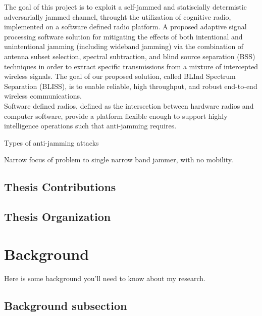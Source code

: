 \documentclass[11pt]{mvlthesis}
\begin{document}
The goal of this project is to exploit a self-jammed and statiscially determistic adversarially jammed channel, throught the utilization of cognitive radio, implemented on a software defined radio platform.  A proposed adaptive signal processing software solution for mitigating the effects of both intentional and unintentional jamming (including wideband jamming) via the combination of antenna subset selection, spectral subtraction, and blind source separation (BSS) techniques in order to extract specific transmissions from a mixture of intercepted wireless signals. The goal of our proposed solution, called BLInd Spectrum Separation (BLISS), is to enable reliable, high throughput, and robust end-to-end wireless communications.\\


Software defined radios, defined as the intersection between hardware radios and computer software\cite{4}, provide a platform flexible enough to support highly intelligence operations such that anti-jamming requires.


Types of anti-jamming attacks

Narrow focus of problem to single narrow band jammer, with no mobility.

\section{Thesis Contributions}

\section{Thesis Organization}

\chapter{Background}
\label{ch:background}

Here is some background you'll need to know about my research.

\section{Background subsection}










%


\end{document}
